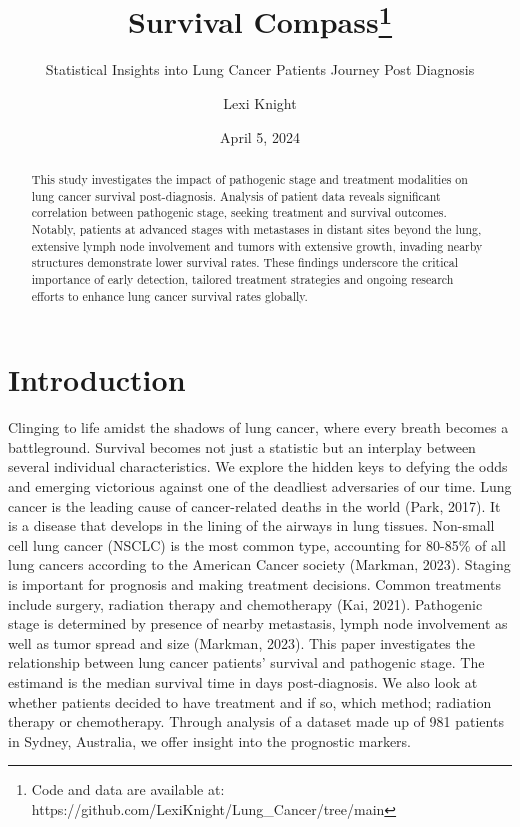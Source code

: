 \documentclass[
  letterpaper,
  DIV=11,
  numbers=noendperiod]{scrartcl}
\title{Survival Compass\thanks{Code and data are available at:
https://github.com/LexiKnight/Lung\_Cancer/tree/main}}
\subtitle{Statistical Insights into Lung Cancer Patients Journey Post
Diagnosis}
\author{Lexi Knight}
\date{April 5, 2024}
\begin{document}
\maketitle
\begin{abstract}
This study investigates the impact of pathogenic stage and treatment
modalities on lung cancer survival post-diagnosis. Analysis of patient
data reveals significant correlation between pathogenic stage, seeking
treatment and survival outcomes. Notably, patients at advanced stages
with metastases in distant sites beyond the lung, extensive lymph node
involvement and tumors with extensive growth, invading nearby structures
demonstrate lower survival rates. These findings underscore the critical
importance of early detection, tailored treatment strategies and ongoing
research efforts to enhance lung cancer survival rates globally.
\end{abstract}
\ifdefined\Shaded\renewenvironment{Shaded}{\begin{tcolorbox}[frame hidden, borderline west={3pt}{0pt}{shadecolor}, enhanced, interior hidden, breakable, sharp corners, boxrule=0pt]}{\end{tcolorbox}}\fi

\hypertarget{introduction}{%
\section{Introduction}\label{introduction}}

Clinging to life amidst the shadows of lung cancer, where every breath
becomes a battleground. Survival becomes not just a statistic but an
interplay between several individual characteristics. We explore the
hidden keys to defying the odds and emerging victorious against one of
the deadliest adversaries of our time. Lung cancer is the leading cause
of cancer-related deaths in the world (Park, 2017). It is a disease that
develops in the lining of the airways in lung tissues. Non-small cell
lung cancer (NSCLC) is the most common type, accounting for 80-85\% of
all lung cancers according to the American Cancer society (Markman,
2023). Staging is important for prognosis and making treatment
decisions. Common treatments include surgery, radiation therapy and
chemotherapy (Kai, 2021). Pathogenic stage is determined by presence of
nearby metastasis, lymph node involvement as well as tumor spread and
size (Markman, 2023). This paper investigates the relationship between
lung cancer patients' survival and pathogenic stage. The estimand is the
median survival time in days post-diagnosis. We also look at whether
patients decided to have treatment and if so, which method; radiation
therapy or chemotherapy. Through analysis of a dataset made up of 981
patients in Sydney, Australia, we offer insight into the prognostic
markers.
\end{document}
